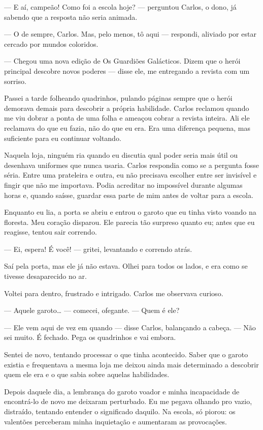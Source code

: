 — E aí, campeão! Como foi a escola hoje? — perguntou Carlos, o dono, já sabendo que a resposta não seria animada.

— O de sempre, Carlos. Mas, pelo menos, tô aqui — respondi, aliviado por estar cercado por mundos coloridos.

— Chegou uma nova edição de Os Guardiões Galácticos. Dizem que o herói principal descobre novos poderes — disse ele, me entregando a revista com um sorriso.

Passei a tarde folheando quadrinhos, pulando páginas sempre que o herói demorava demais para descobrir a própria habilidade. Carlos reclamou quando me viu dobrar a ponta de uma folha e ameaçou cobrar a revista inteira. Ali ele reclamava do que eu fazia, não do que eu era. Era uma diferença pequena, mas suficiente para eu continuar voltando.

Naquela loja, ninguém ria quando eu discutia qual poder seria mais útil ou desenhava uniformes que nunca usaria. Carlos respondia como se a pergunta fosse séria. Entre uma prateleira e outra, eu não precisava escolher entre ser invisível e fingir que não me importava. Podia acreditar no impossível durante algumas horas e, quando saísse, guardar essa parte de mim antes de voltar para a escola.

Enquanto eu lia, a porta se abriu e entrou o garoto que eu tinha visto voando na floresta. Meu coração disparou. Ele parecia tão surpreso quanto eu; antes que eu reagisse, tentou sair correndo.

— Ei, espera! É você! — gritei, levantando e correndo atrás.

Saí pela porta, mas ele já não estava. Olhei para todos os lados, e era como se tivesse desaparecido no ar.

Voltei para dentro, frustrado e intrigado. Carlos me observava curioso.

— Aquele garoto… — comecei, ofegante. — Quem é ele?

— Ele vem aqui de vez em quando — disse Carlos, balançando a cabeça. — Não sei muito. É fechado. Pega os quadrinhos e vai embora.

Sentei de novo, tentando processar o que tinha acontecido. Saber que o garoto existia e frequentava a mesma loja me deixou ainda mais determinado a descobrir quem ele era e o que sabia sobre aquelas habilidades.

Depois daquele dia, a lembrança do garoto voador e minha incapacidade de encontrá-lo de novo me deixaram perturbado. Eu me pegava olhando pro vazio, distraído, tentando entender o significado daquilo. Na escola, só piorou: os valentões perceberam minha inquietação e aumentaram as provocações.

